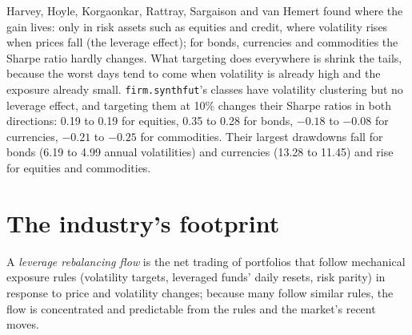 \begin{omfigure}

\label{fig:s1:volatility-targeting-and-risk-managed-portfolios:seeds}
\end{omfigure}

Harvey, Hoyle, Korgaonkar, Rattray, Sargaison and van Hemert found where the gain lives: only in risk assets such as equities and credit, where
volatility rises when prices fall (the leverage effect); for bonds, currencies and commodities the Sharpe ratio hardly changes. What targeting does
everywhere is shrink the tails, because the worst days tend to come when volatility is already high and the exposure already small.
\texttt{firm.synthfut}'s classes have volatility clustering but no leverage effect, and targeting them at 10\% changes their Sharpe ratios in both
directions: 0.19 to 0.19 for equities, 0.35 to 0.28 for bonds, $-0.18$ to $-0.08$ for currencies, $-0.21$ to $-0.25$ for commodities. Their largest
drawdowns fall for bonds (6.19 to 4.99 annual volatilities) and currencies (13.28 to 11.45) and rise for equities and commodities.

\section{The industry's footprint}

\begin{definition}\label{def:s1:volatility-targeting-and-risk-managed-portfolios:flow}
A \emph{leverage rebalancing flow} is the net trading of portfolios that follow mechanical exposure rules
(volatility targets, leveraged funds' daily resets, risk parity) in response to price and volatility changes; because many follow similar rules, the
flow is concentrated and predictable from the rules and the market's recent moves.
\end{definition}

